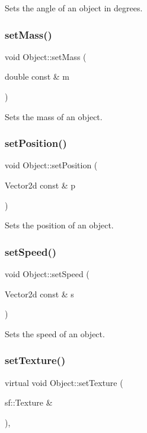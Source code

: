 Sets the angle of an object in degrees. \hypertarget{classObject_a07221bb6a7c823b993005f8a0d3cd7a1}{}\label{classObject_a07221bb6a7c823b993005f8a0d3cd7a1} 
\subsubsection{\texorpdfstring{set\+Mass()}{setMass()}}
{\footnotesize\ttfamily void Object\+::set\+Mass (\begin{DoxyParamCaption}\item[{double const \&}]{m }\end{DoxyParamCaption})}

Sets the mass of an object. \hypertarget{classObject_a03d47d414e9638846de79b4f15cda00f}{}\label{classObject_a03d47d414e9638846de79b4f15cda00f} 
\subsubsection{\texorpdfstring{set\+Position()}{setPosition()}}
{\footnotesize\ttfamily void Object\+::set\+Position (\begin{DoxyParamCaption}\item[{Vector2d const \&}]{p }\end{DoxyParamCaption})}

Sets the position of an object. \hypertarget{classObject_a34421c57b89f3c9c6e0de44c98469585}{}\label{classObject_a34421c57b89f3c9c6e0de44c98469585} 
\subsubsection{\texorpdfstring{set\+Speed()}{setSpeed()}}
{\footnotesize\ttfamily void Object\+::set\+Speed (\begin{DoxyParamCaption}\item[{Vector2d const \&}]{s }\end{DoxyParamCaption})}

Sets the speed of an object. \hypertarget{classObject_a3b23ad400ac8a7133fb470daa4e67467}{}\label{classObject_a3b23ad400ac8a7133fb470daa4e67467} 
\subsubsection{\texorpdfstring{set\+Texture()}{setTexture()}}
{\footnotesize\ttfamily virtual void Object\+::set\+Texture (\begin{DoxyParamCaption}\item[{sf\+::\+Texture \&}]{ }\end{DoxyParamCaption})\hspace{0.3cm}{\ttfamily [inline]}, {\ttfamily [virtual]}}

